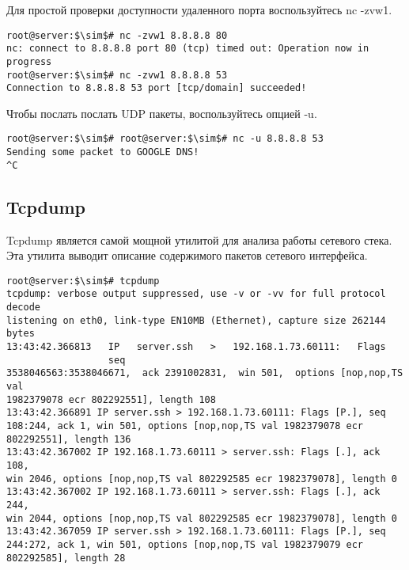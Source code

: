 \documentclass[14pt, a4paper]{article}
\begin{document}
Для простой проверки доступности удаленного порта воспользуйтесь \colorbox{backcolour}{nc -zvw1}.

\newpage

\begin{lstlisting}
root@server:$\sim$# nc -zvw1 8.8.8.8 80
nc: connect to 8.8.8.8 port 80 (tcp) timed out: Operation now in progress
root@server:$\sim$# nc -zvw1 8.8.8.8 53
Connection to 8.8.8.8 53 port [tcp/domain] succeeded!
\end{lstlisting}
\vspace{0.2cm}

Чтобы послать послать UDP пакеты, воспользуйтесь опцией -u.

\vspace{0.3cm}
\begin{lstlisting}
root@server:$\sim$# root@server:$\sim$# nc -u 8.8.8.8 53
Sending some packet to GOOGLE DNS!
^C
\end{lstlisting}

\subsection*{Tcpdump} 

Tcpdump является самой мощной утилитой для анализа работы сетевого стека. Эта утилита выводит
описание содержимого пакетов сетевого интерфейса.

\vspace{0.3cm}
\begin{lstlisting}
root@server:$\sim$# tcpdump
tcpdump: verbose output suppressed, use -v or -vv for full protocol decode
listening on eth0, link-type EN10MB (Ethernet), capture size 262144 bytes
13:43:42.366813   IP   server.ssh   >   192.168.1.73.60111:   Flags
                  seq
3538046563:3538046671,  ack 2391002831,  win 501,  options [nop,nop,TS val
1982379078 ecr 802292551], length 108
13:43:42.366891 IP server.ssh > 192.168.1.73.60111: Flags [P.], seq 
108:244, ack 1, win 501, options [nop,nop,TS val 1982379078 ecr 
802292551], length 136
13:43:42.367002 IP 192.168.1.73.60111 > server.ssh: Flags [.], ack 108, 
win 2046, options [nop,nop,TS val 802292585 ecr 1982379078], length 0
13:43:42.367002 IP 192.168.1.73.60111 > server.ssh: Flags [.], ack 244, 
win 2044, options [nop,nop,TS val 802292585 ecr 1982379078], length 0
13:43:42.367059 IP server.ssh > 192.168.1.73.60111: Flags [P.], seq 
244:272, ack 1, win 501, options [nop,nop,TS val 1982379079 ecr 
802292585], length 28
\end{lstlisting}
\vspace{0.2cm}
\end{document}
